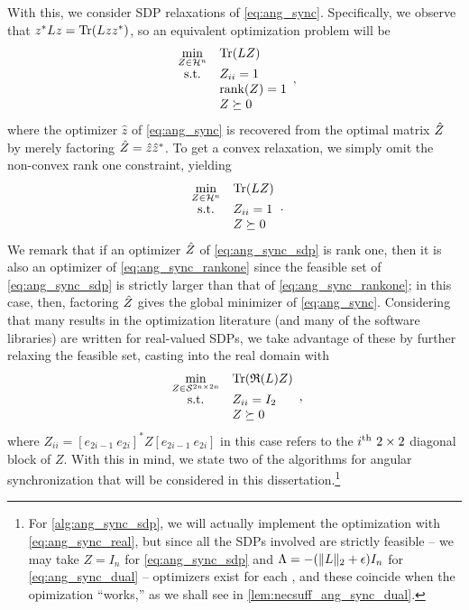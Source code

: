 With this, we consider SDP relaxations of \eqref{eq:ang_sync}.  Specifically, we observe that $z^* L z = \operatorname{Tr}(L z z^*)$, so an equivalent optimization problem will be
\begin{equation}
  \begin{array}{cl}
    \min\limits_{Z \in \mathcal{H}^n} & \operatorname{Tr}(L Z) \\
    \text{s.t.} & Z_{ii} = 1 \\
    & \operatorname{rank}(Z) = 1 \\
    & Z \succeq 0
  \end{array}, \label{eq:ang_sync_rankone}
\end{equation}
where the optimizer $\hat{z}$ of \eqref{eq:ang_sync} is recovered from the optimal matrix $\hat{Z}$ by merely factoring $\hat{Z} = \hat{z} \hat{z}^*$.  To get a convex relaxation, we simply omit the non-convex rank one constraint, yielding \begin{equation} \begin{array}{cl} \min\limits_{Z \in \mathcal{H}^n} & \operatorname{Tr}(L Z) \\ \text{s.t.} & Z_{ii} = 1 \\ & Z \succeq 0 \end{array}. \label{eq:ang_sync_sdp} \end{equation}  We remark that if an optimizer $\hat{Z}$ of \eqref{eq:ang_sync_sdp} is rank one, then it is also an optimizer of \eqref{eq:ang_sync_rankone} since the feasible set of \eqref{eq:ang_sync_sdp} is strictly larger than that of \eqref{eq:ang_sync_rankone}; in this case, then, factoring $\hat{Z}$ gives the global minimizer of \eqref{eq:ang_sync}.  Considering that many results in the optimization literature (and many of the software libraries) are written for real-valued SDPs, we take advantage of these by further relaxing the feasible set, casting into the real domain with
\begin{equation}
  \begin{array}{cl}
    \min\limits_{Z \in \mathcal{S}^{2n \times 2n}} & \operatorname{Tr}(\mathfrak{R}(L) Z) \\
    \text{s.t.} & Z_{ii} = I_2 \\
    & Z \succeq 0
  \end{array}, \label{eq:ang_sync_real}
\end{equation}
where $Z_{ii} = [e_{2i - 1} \ e_{2i}]^* Z [e_{2i - 1} \ e_{2i}]$ in this case refers to the $i^{\text{th}} \ 2 \times 2$ diagonal block of $Z$.  With this in mind, we state two of the algorithms for angular synchronization that will be considered in this dissertation.\footnote{For \cref{alg:ang_sync_sdp}, we will actually implement the optimization with \eqref{eq:ang_sync_real}, but since all the SDPs involved are strictly feasible -- we may take $Z = I_n$ for \eqref{eq:ang_sync_sdp} and $\Lambda = -(\lVert L\rVert_2 + \epsilon) I_n$ for \eqref{eq:ang_sync_dual} -- optimizers exist for each \cite[Thm. 3.1]{boyd1996semidef_prog}, and these coincide when the opimization ``works,'' as we shall see in \cref{lem:necsuff_ang_sync_dual}.}

